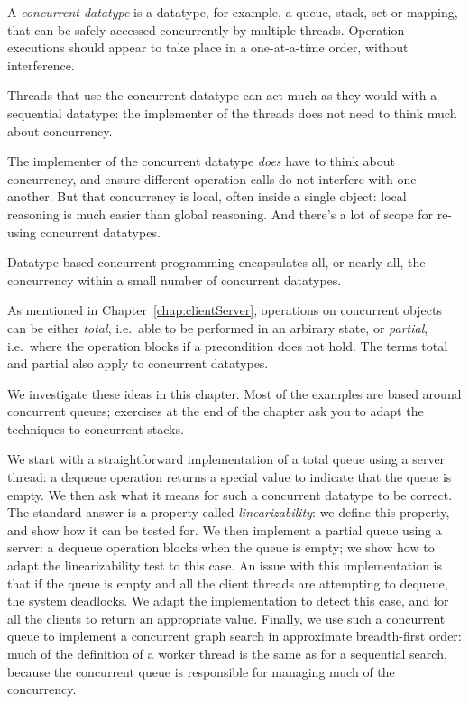 A \emph{concurrent datatype} is a datatype, for example, a queue, stack, set
or mapping, that can be safely accessed concurrently by multiple threads.
Operation executions should appear to take place in a one-at-a-time order,
without interference.

Threads that use the concurrent datatype can act much as they would with a
sequential datatype: the implementer of the threads does not need to think
much about concurrency.  

The implementer of the concurrent datatype \emph{does} have to think about
concurrency, and ensure different operation calls do not interfere with one
another.  But that concurrency is local, often inside a single object: local
reasoning is much easier than global reasoning.  And there's a lot of scope
for re-using concurrent datatypes.

Datatype-based concurrent programming encapsulates all, or nearly all, the
concurrency within a small number of concurrent datatypes.

As mentioned in Chapter~\ref{chap:clientServer}, operations on concurrent
objects can be either \emph{total}, i.e.~able to be performed in an arbirary
state, or \emph{partial}, i.e.~where the operation blocks if a precondition
does not hold.  The terms total and partial also apply to concurrent
datatypes.

We investigate these ideas in this chapter.  Most of the examples are based
around concurrent queues; exercises at the end of the chapter ask you to adapt
the techniques to concurrent stacks.

We start with a straightforward implementation of a total queue using a server
thread: a dequeue operation returns a special value to indicate that the queue
is empty.  We then ask what it means for such a concurrent datatype to be
correct.  The standard answer is a property called \emph{linearizability}: we
define this property, and show how it can be tested for.  We then implement a
partial queue using a server: a dequeue operation blocks when the queue is
empty; we show how to adapt the linearizability test to this case.  An issue
with this implementation is that if the queue is empty and all the client
threads are attempting to dequeue, the system deadlocks.  We adapt the
implementation to detect this case, and for all the clients to return an
appropriate value.  Finally, we use such a concurrent queue to implement a
concurrent graph search in approximate breadth-first order: much of the
definition of a worker thread is the same as for a sequential search, because
the concurrent queue is responsible for managing much of the concurrency.

